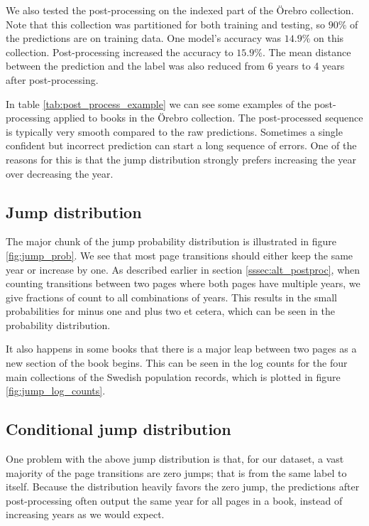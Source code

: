 We also tested the post-processing on the indexed part of the Örebro collection. Note that this collection was partitioned for both training and testing, so $90\%$ of the predictions are on training data. One model's accuracy was $14.9\%$ on this collection. Post-processing increased the accuracy to $15.9\%$. The mean distance between the prediction and the label was also reduced from 6 years to 4 years after post-processing.



In table \ref{tab:post_process_example} we can see some examples of the post-processing applied to books in the Örebro collection. The post-processed sequence is typically very smooth compared to the raw predictions. Sometimes a single confident but incorrect prediction can start a long sequence of errors. One of the reasons for this is that the jump distribution strongly prefers increasing the year over decreasing the year.

\subsection{Jump distribution}



The major chunk of the jump probability distribution is illustrated in figure \ref{fig:jump_prob}. We see that most page transitions should either keep the same year or increase by one.
As described earlier in section \ref{sssec:alt_postproc}, when counting transitions between two pages where both pages have multiple years, we give fractions of count to all combinations of years. This results in the small probabilities for minus one and plus two et cetera, which can be seen in the probability distribution.

It also happens in some books that there is a major leap between two pages as a new section of the book begins. This can be seen in the log counts for the four main collections of the Swedish population records, which is plotted in figure \ref{fig:jump_log_counts}.

\subsection{Conditional jump distribution}
One problem with the above jump distribution is that, for our dataset, a vast majority of the page transitions are zero jumps; that is from the same label to itself.
Because the distribution heavily favors the zero jump, the predictions after post-processing often output the same year for all pages in a book, instead of increasing years as we would expect.

